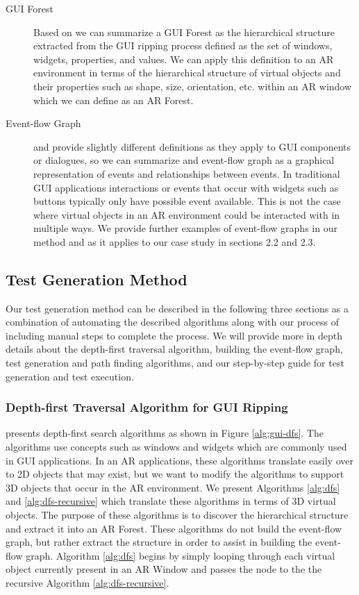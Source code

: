 \documentclass[final,3p]{CSP}
\begin{document}
\begin{description}
\item[GUI Forest] Based on \cite{GUIRip} we can summarize a GUI Forest as the hierarchical structure extracted from the GUI ripping process defined as the set of windows, widgets, properties, and values.  We can apply this definition to an AR environment in terms of the hierarchical structure of virtual objects and their properties such as shape, size, orientation, etc. within an AR window which we can define as an AR Forest.
\item[Event-flow Graph] \cite{GUIRip} and \cite{EventFlow} provide slightly different definitions as they apply to GUI components or dialogues, so we can summarize and event-flow graph as a graphical representation of events and relationships between events.  In traditional GUI applications interactions or events that occur with widgets such as buttons typically only have possible event available.  This is not the case where virtual objects in an AR environment could be interacted with in multiple ways.  We provide further examples of event-flow graphs in our method and as it applies to our case study in sections 2.2 and 2.3.
\end{description}

\subsection{Test Generation Method}
\noindent

Our test generation method can be described in the following three sections as a combination of automating the described algorithms along with our process of including manual steps to complete the process.  We will provide more in depth details about the depth-first traversal algorithm, building the event-flow graph, test generation and path finding algorithms, and our step-by-step guide for test generation and test execution.

\subsubsection{Depth-first Traversal Algorithm for GUI Ripping}
\noindent

\cite{GUIRip} presents depth-first search algorithms as shown in Figure \ref{alg:gui-dfs}.  The algorithms use concepts such as windows and widgets which are commonly used in GUI applications.  In an AR applications, these algorithms translate easily over to 2D objects that may exist, but we want to modify the algorithms to support 3D objects that occur in the AR environment.  We present Algorithms \ref{alg:dfs} and \ref{alg:dfs-recursive} which translate these algorithms in terms of 3D virtual objects. The purpose of these algorithms is to discover the hierarchical structure and extract it into an AR Forest. These algorithms do not build the event-flow graph, but rather extract the structure in order to assist in building the event-flow graph. Algorithm \ref{alg:dfs} begins by simply looping through each virtual object currently present in an AR Window and passes the node to the the recursive Algorithm \ref{alg:dfs-recursive}.
\end{document}
